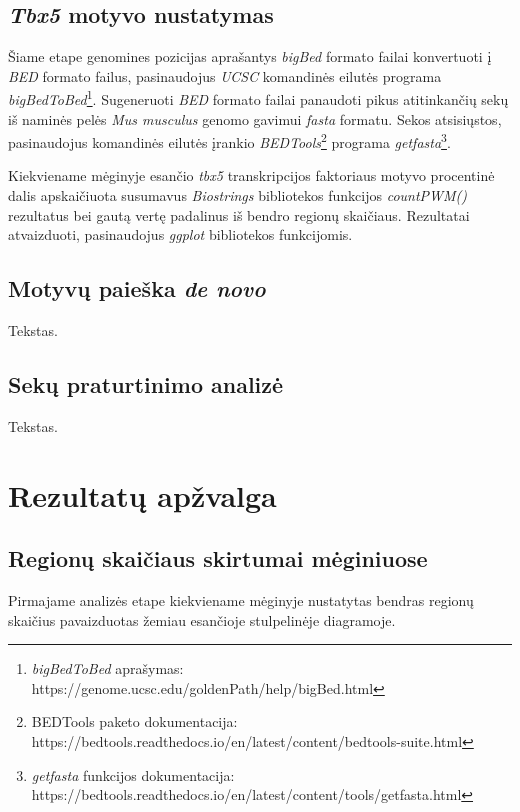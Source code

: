 \documentclass[12pt]{article}
\begin{document}
\subsection{\emph{Tbx5} motyvo nustatymas}
Šiame etape genomines pozicijas aprašantys \emph{bigBed} formato
failai konvertuoti į \emph{BED} formato failus, pasinaudojus
\emph{UCSC} komandinės eilutės programa \emph{bigBedToBed}\footnote[1]
{\emph{bigBedToBed} aprašymas: 
https://genome.ucsc.edu/goldenPath/help/bigBed.html}.
Sugeneruoti \emph{BED} formato failai panaudoti pikus atitinkančių
sekų iš naminės pelės \emph{Mus musculus} genomo gavimui
\emph{fasta} formatu. Sekos atsisiųstos, pasinaudojus komandinės
eilutės įrankio \emph{BEDTools}\footnote[2]{BEDTools paketo
dokumentacija: 
https://bedtools.readthedocs.io/en/latest/content/bedtools-suite.html}
programa \emph{getfasta}\footnote[3]{\emph{getfasta} funkcijos
dokumentacija: 
https://bedtools.readthedocs.io/en/latest/content/tools/getfasta.html}.

Kiekviename mėginyje esančio \emph{tbx5} transkripcijos faktoriaus
motyvo procentinė dalis apskaičiuota susumavus \emph{Biostrings}
bibliotekos funkcijos \emph{countPWM()} rezultatus bei gautą
vertę padalinus iš bendro regionų skaičiaus.
Rezultatai atvaizduoti, pasinaudojus \emph{ggplot} bibliotekos
funkcijomis.

\subsection{Motyvų paieška \emph{de novo}}
Tekstas.

\subsection{Sekų praturtinimo analizė}
Tekstas.

\newpage


\section{Rezultatų apžvalga}
\subsection{Regionų skaičiaus skirtumai mėginiuose}
Pirmajame analizės etape kiekviename mėginyje nustatytas bendras
regionų skaičius pavaizduotas žemiau esančioje stulpelinėje
diagramoje.
\end{document}
